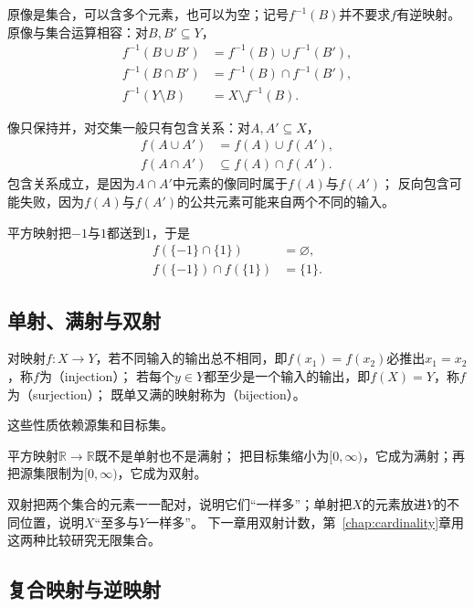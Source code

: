 原像是集合，可以含多个元素，也可以为空；记号$f^{-1}(B)$并不要求$f$有逆映射。
原像与集合运算相容：对$B,B'\subseteq Y$，
\begin{align*}
 f^{-1}(B\cup B')&=f^{-1}(B)\cup f^{-1}(B'),\\
 f^{-1}(B\cap B')&=f^{-1}(B)\cap f^{-1}(B'),\\
 f^{-1}(Y\setminus B)&=X\setminus f^{-1}(B).
\end{align*}

像只保持并，对交集一般只有包含关系：对$A,A'\subseteq X$，
\begin{align*}
 f(A\cup A')&=f(A)\cup f(A'),\\
 f(A\cap A')&\subseteq f(A)\cap f(A').
\end{align*}
包含关系成立，是因为$A\cap A'$中元素的像同时属于$f(A)$与$f(A')$；
反向包含可能失败，因为$f(A)$与$f(A')$的公共元素可能来自两个不同的输入。
\begin{example}[不保持交集的映射]
\label{ex:sets-image-intersection}
平方映射把$-1$与$1$都送到$1$，于是
\begin{align*}
 f(\{-1\}\cap\{1\})&=\varnothing,\\
 f(\{-1\})\cap f(\{1\})&=\{1\}.
\end{align*}
\end{example}

\subsection{单射、满射与双射}
\label{sec:prelim-function-types}

对映射$f:X\to Y$，若不同输入的输出总不相同，即$f(x_1)=f(x_2)$必推出$x_1=x_2$，称$f$为（injection）；
若每个$y\in Y$都至少是一个输入的输出，即$f(X)=Y$，称$f$为（surjection）；
既单又满的映射称为（bijection）。

这些性质依赖源集和目标集。
\begin{example}[改变源集与目标集的平方映射]
\label{ex:sets-square-map-types}
平方映射$\mathbb R\to\mathbb R$既不是单射也不是满射；
把目标集缩小为$[0,\infty)$，它成为满射；再把源集限制为$[0,\infty)$，它成为双射。
\end{example}
双射把两个集合的元素一一配对，说明它们“一样多”；单射把$X$的元素放进$Y$的不同位置，说明$X$“至多与$Y$一样多”。
下一章用双射计数，第~\ref{chap:cardinality}章用这两种比较研究无限集合。

\subsection{复合映射与逆映射}
\label{sec:prelim-map-operations}

